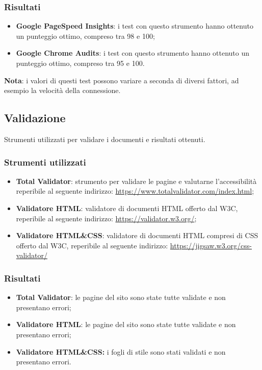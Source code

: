 \documentclass[12pt]{article}
\begin{document}
	\subsubsection{Risultati}
		\begin{itemize}
			\item \textbf{Google PageSpeed Insights}: i test con questo strumento hanno ottenuto un punteggio ottimo, compreso tra 98 e 100;
			\item \textbf{Google Chrome Audits}: i test con questo strumento hanno ottenuto un punteggio ottimo, compreso tra 95 e 100.
		\end{itemize}
	\textbf{Nota}: i valori di questi test possono variare a seconda di diversi fattori, ad esempio la velocità della connessione.
	\subsection{Validazione}
	Strumenti utilizzati per validare i documenti e risultati ottenuti.
	\subsubsection{Strumenti utilizzati}
	\begin{itemize}
		\item \textbf{Total Validator}: strumento per validare le pagine e valutarne l'accessibilità reperibile al seguente indirizzo: \url{https://www.totalvalidator.com/index.html};
		\item \textbf{Validatore HTML}: validatore di documenti HTML offerto dal W3C, reperibile al seguente indirizzo: \url{https://validator.w3.org/};
		\item \textbf{Validatore HTML\&CSS}: validatore di documenti HTML compresi di CSS offerto dal W3C, reperibile al seguente indirizzo: \url{https://jigsaw.w3.org/css-validator/}
	\end{itemize}
	\subsubsection{Risultati}
		\begin{itemize}
			\item \textbf{Total Validator}: le pagine del sito sono state tutte validate e non presentano errori;
			\item \textbf{Validatore HTML}: le pagine del sito sono state tutte validate e non presentano errori;
			\item \textbf{Validatore HTML\&CSS:} i fogli di stile sono stati validati e non presentano errori.
		\end{itemize}
\end{document}
